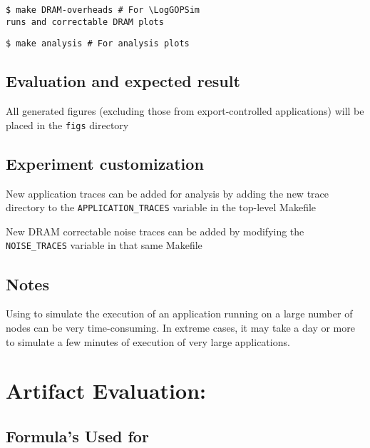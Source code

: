 \begin{Verbatim}[commandchars=\\\{\},frame=single]
  $ make DRAM-overheads # For \LogGOPSim
runs and correctable DRAM plots
\end{Verbatim}

\begin{Verbatim}[commandchars=\\\{\},frame=single]
  $ make analysis # For analysis plots
\end{Verbatim}

\subsection{Evaluation and expected result}

All generated figures (excluding those from export-controlled applications) will
be placed in the {\texttt{figs}} directory

\subsection{Experiment customization}

New application traces can be added for analysis by adding the new trace
directory to the {\texttt{APPLICATION\_TRACES}} variable in the top-level Makefile

New DRAM correctable noise traces can be added by modifying the
{\texttt{NOISE\_TRACES}} variable in that same Makefile

\subsection{Notes}

Using \LogGOPSim to simulate the execution of an application running on 
a large number of nodes can be very time-consuming.  In extreme cases,
it may take a day or more to simulate a few minutes of execution of
very large applications.

\clearpage
\section{Artifact Evaluation: \myTitle}

\subsection{Formula's Used for }
